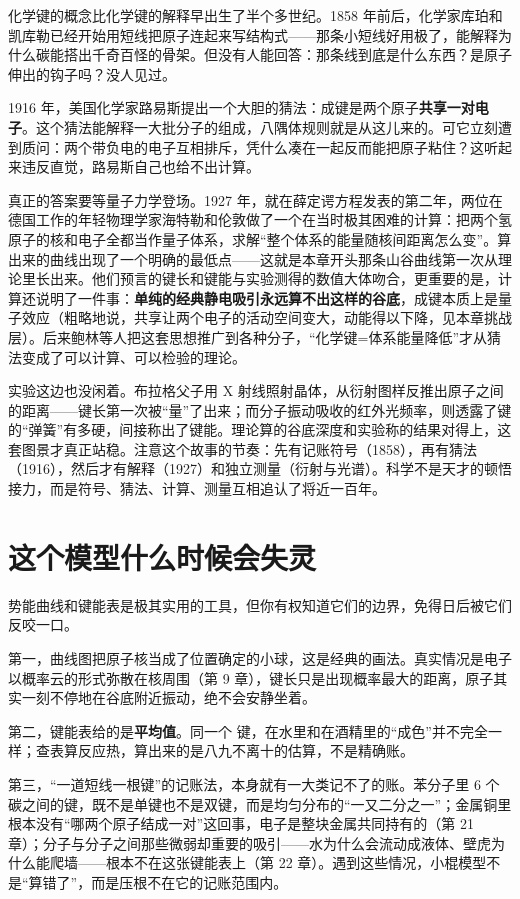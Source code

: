 \begin{zhengju}
化学键的概念比化学键的解释早出生了半个多世纪。1858 年前后，化学家库珀和凯库勒已经开始用短线把原子连起来写结构式——那条小短线好用极了，能解释为什么碳能搭出千奇百怪的骨架。但没有人能回答：那条线到底是什么东西？是原子伸出的钩子吗？没人见过。

1916 年，美国化学家路易斯提出一个大胆的猜法：成键是两个原子\textbf{共享一对电子}。这个猜法能解释一大批分子的组成，八隅体规则就是从这儿来的。可它立刻遭到质问：两个带负电的电子互相排斥，凭什么凑在一起反而能把原子粘住？这听起来违反直觉，路易斯自己也给不出计算。

真正的答案要等量子力学登场。1927 年，就在薛定谔方程发表的第二年，两位在德国工作的年轻物理学家海特勒和伦敦做了一个在当时极其困难的计算：把两个氢原子的核和电子全都当作量子体系，求解“整个体系的能量随核间距离怎么变”。算出来的曲线出现了一个明确的最低点——这就是本章开头那条山谷曲线第一次从理论里长出来。他们预言的键长和键能与实验测得的数值大体吻合，更重要的是，计算还说明了一件事：\textbf{单纯的经典静电吸引永远算不出这样的谷底}，成键本质上是量子效应（粗略地说，共享让两个电子的活动空间变大，动能得以下降，见本章挑战层）。后来鲍林等人把这套思想推广到各种分子，“化学键=体系能量降低”才从猜法变成了可以计算、可以检验的理论。

实验这边也没闲着。布拉格父子用 X 射线照射晶体，从衍射图样反推出原子之间的距离——键长第一次被“量”了出来；而分子振动吸收的红外光频率，则透露了键的“弹簧”有多硬，间接称出了键能。理论算的谷底深度和实验称的结果对得上，这套图景才真正站稳。注意这个故事的节奏：先有记账符号（1858），再有猜法（1916），然后才有解释（1927）和独立测量（衍射与光谱）。科学不是天才的顿悟接力，而是符号、猜法、计算、测量互相追认了将近一百年。
\end{zhengju}

\section{这个模型什么时候会失灵}

势能曲线和键能表是极其实用的工具，但你有权知道它们的边界，免得日后被它们反咬一口。

第一，曲线图把原子核当成了位置确定的小球，这是经典的画法。真实情况是电子以概率云的形式弥散在核周围（第 9 章），键长只是出现概率最大的距离，原子其实一刻不停地在谷底附近振动，绝不会安静坐着。

第二，键能表给的是\textbf{平均值}。同一个  键，在水里和在酒精里的“成色”并不完全一样；查表算反应热，算出来的是八九不离十的估算，不是精确账。

第三，“一道短线一根键”的记账法，本身就有一大类记不了的账。苯分子里 6 个碳之间的键，既不是单键也不是双键，而是均匀分布的“一又二分之一”；金属铜里根本没有“哪两个原子结成一对”这回事，电子是整块金属共同持有的（第 21 章）；分子与分子之间那些微弱却重要的吸引——水为什么会流动成液体、壁虎为什么能爬墙——根本不在这张键能表上（第 22 章）。遇到这些情况，小棍模型不是“算错了”，而是压根不在它的记账范围内。

